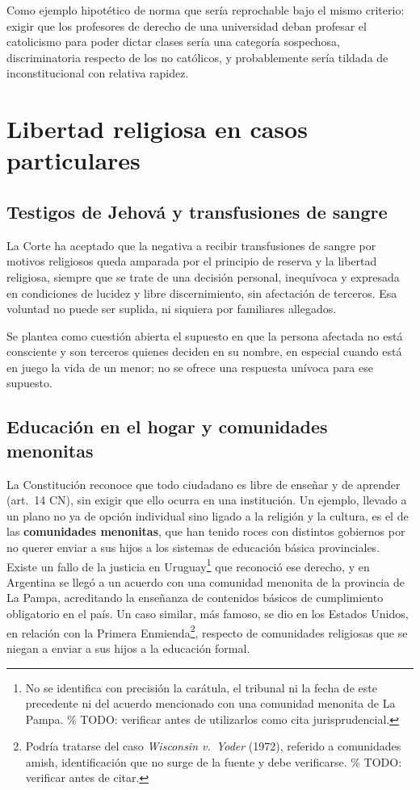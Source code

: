 \documentclass[12pt,oneside]{book}
\begin{document}
Como ejemplo hipotético de norma que sería reprochable bajo el mismo criterio: exigir que los profesores de derecho de una universidad deban profesar el catolicismo para poder dictar clases sería una categoría sospechosa, discriminatoria respecto de los no católicos, y probablemente sería tildada de inconstitucional con relativa rapidez.

\section{Libertad religiosa en casos particulares}

\subsection{Testigos de Jehová y transfusiones de sangre}

La Corte ha aceptado que la negativa a recibir transfusiones de sangre por motivos religiosos queda amparada por el principio de reserva y la libertad religiosa, siempre que se trate de una decisión personal, inequívoca y expresada en condiciones de lucidez y libre discernimiento, sin afectación de terceros. Esa voluntad no puede ser suplida, ni siquiera por familiares allegados.

\begin{important}
Se plantea como cuestión abierta el supuesto en que la persona afectada no está consciente y son terceros quienes deciden en su nombre, en especial cuando está en juego la vida de un menor; no se ofrece una respuesta unívoca para ese supuesto.
\end{important}

\subsection{Educación en el hogar y comunidades menonitas}

La Constitución reconoce que todo ciudadano es libre de enseñar y de aprender (art.\ 14 CN), sin exigir que ello ocurra en una institución. Un ejemplo, llevado a un plano no ya de opción individual sino ligado a la religión y la cultura, es el de las \textbf{comunidades menonitas}, que han tenido roces con distintos gobiernos por no querer enviar a sus hijos a los sistemas de educación básica provinciales. Existe un fallo de la justicia en Uruguay\footnote{No se identifica con precisión la carátula, el tribunal ni la fecha de este precedente ni del acuerdo mencionado con una comunidad menonita de La Pampa. \% TODO: verificar antes de utilizarlos como cita jurisprudencial.} que reconoció ese derecho, y en Argentina se llegó a un acuerdo con una comunidad menonita de la provincia de La Pampa, acreditando la enseñanza de contenidos básicos de cumplimiento obligatorio en el país. Un caso similar, más famoso, se dio en los Estados Unidos, en relación con la Primera Enmienda\footnote{Podría tratarse del caso \emph{Wisconsin v.\ Yoder} (1972), referido a comunidades amish, identificación que no surge de la fuente y debe verificarse. \% TODO: verificar antes de citar.}, respecto de comunidades religiosas que se niegan a enviar a sus hijos a la educación formal.
\end{document}
